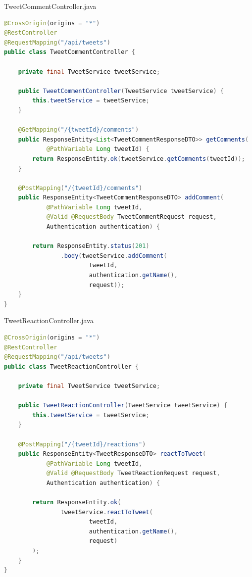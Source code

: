 \documentclass[12pt,a4paper]{article}
\begin{document}
\begin{filebox}{TweetCommentController.java}
\begin{lstlisting}[language=Java]
@CrossOrigin(origins = "*")
@RestController
@RequestMapping("/api/tweets")
public class TweetCommentController {

    private final TweetService tweetService;

    public TweetCommentController(TweetService tweetService) {
        this.tweetService = tweetService;
    }

    @GetMapping("/{tweetId}/comments")
    public ResponseEntity<List<TweetCommentResponseDTO>> getComments(
            @PathVariable Long tweetId) {
        return ResponseEntity.ok(tweetService.getComments(tweetId));
    }

    @PostMapping("/{tweetId}/comments")
    public ResponseEntity<TweetCommentResponseDTO> addComment(
            @PathVariable Long tweetId,
            @Valid @RequestBody TweetCommentRequest request,
            Authentication authentication) {

        return ResponseEntity.status(201)
                .body(tweetService.addComment(
                        tweetId,
                        authentication.getName(),
                        request));
    }
}
\end{lstlisting}
\end{filebox}

\begin{filebox}{TweetReactionController.java}
\begin{lstlisting}[language=Java]
@CrossOrigin(origins = "*")
@RestController
@RequestMapping("/api/tweets")
public class TweetReactionController {

    private final TweetService tweetService;

    public TweetReactionController(TweetService tweetService) {
        this.tweetService = tweetService;
    }

    @PostMapping("/{tweetId}/reactions")
    public ResponseEntity<TweetResponseDTO> reactToTweet(
            @PathVariable Long tweetId,
            @Valid @RequestBody TweetReactionRequest request,
            Authentication authentication) {

        return ResponseEntity.ok(
                tweetService.reactToTweet(
                        tweetId,
                        authentication.getName(),
                        request)
        );
    }
}
\end{lstlisting}
\end{filebox}
\end{document}
